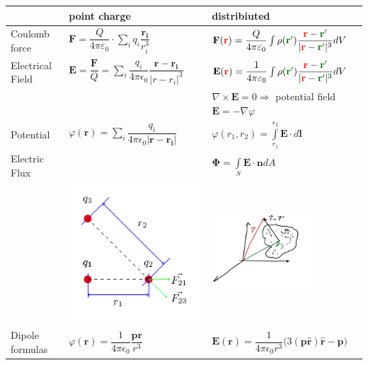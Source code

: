 	\renewcommand{\arraystretch}{2}
	\begin{tabularx}{\columnwidth} {lXX}
		\hline
		&point charge & distribiuted \\
		\hline
		Coulomb force&
		$\mathbf{F} = \dfrac{Q}{4\pi \varepsilon_0}\cdot \sum\limits_{i} q_i \dfrac{\mathbf{r_i}}{r_i^3}$&
		$\mathbf{F}(\textcolor{red}{\mathbf{r}}) = \dfrac{Q}{ 4\pi\varepsilon_0}\int\rho(\textcolor{darkgreen}{\mathbf{r'}}) \dfrac{\textcolor{red}{\mathbf{r}} - \textcolor{darkgreen}{\mathbf{r'}}}{|\textcolor{red}{\mathbf{r}} - \textcolor{darkgreen}{\mathbf{r'}}|^3} dV$ \\
		\hline
		Electrical Field&
		 $ \mathbf{E} = \dfrac{\mathbf{F}}{Q} = \sum\limits_i\dfrac{q_i}{4\pi\epsilon_0}\dfrac{\mathbf{r - r_i}}{|r-r_i|^3}$ &
		 $ \mathbf{E}(\textcolor{red}{\mathbf{r}}) =  \dfrac{1}{4\pi\varepsilon_0} \int \rho(\textcolor{darkgreen}{\mathbf{r'}}) \dfrac{\textcolor{red}{\mathbf{r}} - \textcolor{darkgreen}{\mathbf{r'}}}{|\textcolor{red}{\mathbf{r}} - \textcolor{darkgreen}{\mathbf{r'}}|^3}dV$ \\
		 & &  $\nabla\times\mathbf{E} = 0 \Rightarrow$ potential field $\mathbf{E}=-\nabla \varphi$\\
		\hline 
		Potential &
		$\varphi(\mathbf{r}) = \sum\limits_i \dfrac{ q_i}{4\pi\epsilon_0 |\mathbf{r}-\mathbf{r_i|}}$&
		$\varphi(r_1, r_2) = \int\limits_{r_1}^{r_2} \mathbf{E}\cdot d\mathbf{l}$\\
		\hline 
		Electric Flux & &
		$\mathbf{\Phi} = \int\limits_S \mathbf{E}\cdot\mathbf{n} dA$
		\\
		\hline 
		&\includegraphics[scale = 1]{tikz/pointcharge.pdf} & 		\includegraphics[width = 4cm]{images/elfield} \\
		\hline 
		Dipole formulas & $\varphi(\mathbf{r}) = \dfrac{1}{4\pi\epsilon_0}\dfrac{\mathbf{pr}}{r^3}$&
		$\mathbf{E}(\mathbf{r}) = \dfrac{1}{4\pi\epsilon_0r^3}(3\mathbf{(p\hat{r})\hat{r}-p)}$\\
		\hline 
	\end{tabularx}


